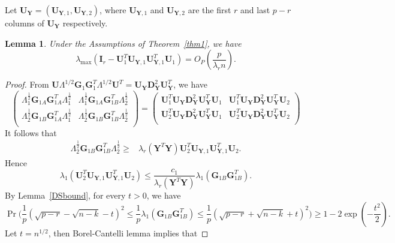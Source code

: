 \documentclass[12pt]{article} %
\newcommand{\bY}{\mathbf{Y}}
\newcommand{\bG}{\mathbf{G}}
\newcommand{\bI}{\mathbf{I}}
\newcommand{\bU}{\mathbf{U}}
\newcommand{\bD}{\mathbf{D}}
\newtheorem{lemma}{Lemma}
\theoremstyle{definition}
\begin{document}
Let $\bU_\bY=(\bU_{\bY,1},\bU_{\bY,2})$, where $\bU_{\bY,1}$ and $\bU_{\bY,2}$ are the first $r$ and last $p-r$ columns of $\bU_\bY$ respectively.
\begin{lemma}\label{PCAlemma2}
    Under the Assumptions of Theorem~\ref{thm1}, we have
$$
\lambda_{\max}(\bI_r-\bU_1^T \bU_{\bY,1}\bU_{\bY,1}^T \bU_1)
=O_P(\frac{ p}{\lambda_r n}).
$$
\end{lemma}
\begin{proof}
    From
$
\bU\Lambda^{1/2} \bG_1 \bG_1^T \Lambda^{1/2} \bU^T 
=\bU_{\bY}\bD_{\bY}^2 \bU_{\bY}^T
$,
we have
$$
    \begin{pmatrix}        
        \Lambda_{1}^{\frac{1}{2}}\bG_{1A} \bG_{1A}^T \Lambda_1^{\frac{1}{2}}&
        \Lambda_{1}^{\frac{1}{2}} \bG_{1A}\bG_{1B}^T\Lambda_2^{\frac{1}{2}}\\
        \Lambda_{2}^{\frac{1}{2}} \bG_{1B} \bG_{1A}^T\Lambda_1^{\frac{1}{2}} &
        \Lambda_{2}^{\frac{1}{2}}\bG_{1B}\bG_{1B}^T\Lambda_2^{\frac{1}{2}}\\
    \end{pmatrix}
    =
    \begin{pmatrix}        
         \bU_1^T \bU_{\bY}\bD_{\bY}^2 \bU_{\bY}^T \bU_1&
         \bU_1^T \bU_{\bY}\bD_{\bY}^2 \bU_{\bY}^T \bU_2\\
        \bU_2^T \bU_{\bY}\bD_{\bY}^2 \bU_{\bY}^T \bU_1&
         \bU_2^T \bU_{\bY}\bD_{\bY}^2 \bU_{\bY}^T \bU_2\\
    \end{pmatrix}
$$
It follows that
$$
\begin{aligned}
 \Lambda_{2}^{\frac{1}{2}}\bG_{1B} \bG_{1B}^T  \Lambda_{2}^{\frac{1}{2}}
\geq&
    \lambda_r(\bY^T \bY) \bU_{2}^T \bU_{\bY,1}\bU_{\bY,1}^T \bU_{2}.
\end{aligned}
$$
Hence
    \begin{equation}\label{ineq:eigenvector}
\lambda_{1}(\bU_{2}^T \bU_{\bY,1} \bU_{\bY,1}^T \bU_{2})\leq
\frac{c_1}{\lambda_r(\bY^T \bY)} \lambda_{1}
(\bG_{1B} \bG_{1B}^T).
    \end{equation}
    By Lemma~\ref{DSbound}, for every $t>0$, we have
    $$
    \Pr\Big(\frac{1}{p}(\sqrt{p-r}-\sqrt{n-k}-t)^2 \leq \frac{1}{p}{\lambda_1(\bG_{1B}\bG_{1B}^T)}\leq \frac{1}{p}(\sqrt{p-r}+\sqrt{n-k}+t)^2 \Big) 
   \geq 1-2\exp(-\frac{t^2}{2}).
    $$
    Let $t=n^{1/2}$, then Borel-Cantelli lemma implies that 

\end{proof}
\end{document}
